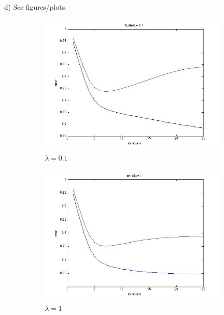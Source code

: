 \documentclass[12pt]{report}
\begin{document}
d) See figures/plots.

\begin{figure}
    \centering
    \begin{subfigure}[b]{0.3\textwidth}
        \centering
        \includegraphics[width=\textwidth]{l01.jpg}
        \caption{$\lambda = 0.1$}
        \label{fig:y equals x}
    \end{subfigure}
    \hfill
    \begin{subfigure}[b]{0.3\textwidth}
        \centering
        \includegraphics[width=\textwidth]{l1.jpg}
        \caption{$\lambda = 1$}
        \label{fig:three sin x}
    \end{subfigure}
    \hfill
    \begin{subfigure}[b]{0.3\textwidth}

\end{subfigure}
\end{figure}
\end{document}
